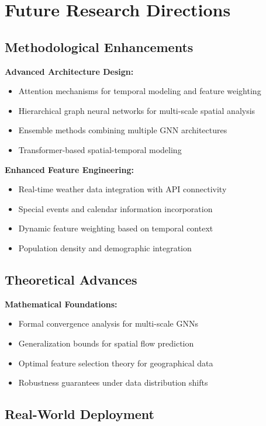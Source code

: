 \documentclass[twocolumn,11pt]{IEEEtran}  %
\begin{document}
\section{Future Research Directions}

\subsection{Methodological Enhancements}

\textbf{Advanced Architecture Design:}
\begin{itemize}
\item Attention mechanisms for temporal modeling and feature weighting
\item Hierarchical graph neural networks for multi-scale spatial analysis
\item Ensemble methods combining multiple GNN architectures
\item Transformer-based spatial-temporal modeling
\end{itemize}

\textbf{Enhanced Feature Engineering:}
\begin{itemize}
\item Real-time weather data integration with API connectivity
\item Special events and calendar information incorporation
\item Dynamic feature weighting based on temporal context
\item Population density and demographic integration
\end{itemize}

\subsection{Theoretical Advances}

\textbf{Mathematical Foundations:}
\begin{itemize}
\item Formal convergence analysis for multi-scale GNNs
\item Generalization bounds for spatial flow prediction
\item Optimal feature selection theory for geographical data
\item Robustness guarantees under data distribution shifts
\end{itemize}

\subsection{Real-World Deployment}
\end{document}
